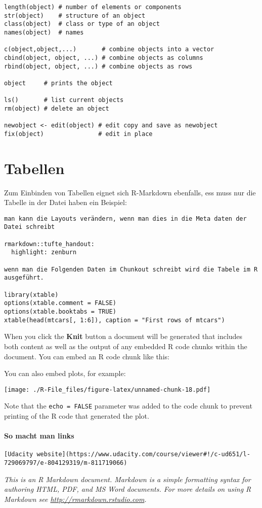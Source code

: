 \documentclass[]{article}
\begin{document}
\begin{verbatim}
length(object) # number of elements or components
str(object)    # structure of an object 
class(object)  # class or type of an object
names(object)  # names

c(object,object,...)       # combine objects into a vector
cbind(object, object, ...) # combine objects as columns
rbind(object, object, ...) # combine objects as rows 

object     # prints the object

ls()       # list current objects
rm(object) # delete an object

newobject <- edit(object) # edit copy and save as newobject 
fix(object)               # edit in place
\end{verbatim}

\section{Tabellen}\label{tabellen}

Zum Einbinden von Tabellen eignet sich R-Markdown ebenfalls, ess muss
nur die Tabelle in der Datei haben ein Beispiel:

\begin{verbatim}
man kann die Layouts verändern, wenn man dies in die Meta daten der Datei schreibt

rmarkdown::tufte_handout:
  highlight: zenburn
  
wenn man die Folgenden Daten im Chunkout schreibt wird die Tabele im R ausgeführt.

library(xtable)
options(xtable.comment = FALSE)
options(xtable.booktabs = TRUE)
xtable(head(mtcars[, 1:6]), caption = "First rows of mtcars")
\end{verbatim}

When you click the \textbf{Knit} button a document will be generated
that includes both content as well as the output of any embedded R code
chunks within the document. You can embed an R code chunk like this:

You can also embed plots, for example:

\texttt{[image: ./R-File\_files/figure-latex/unnamed-chunk-18.pdf]}

Note that the \texttt{echo = FALSE} parameter was added to the code
chunk to prevent printing of the R code that generated the plot.

\paragraph{So macht man links}\label{so-macht-man-links}

\begin{verbatim}
[Udacity website](https://www.udacity.com/course/viewer#!/c-ud651/l-729069797/e-804129319/m-811719066)
\end{verbatim}

\emph{This is an R Markdown document. Markdown is a simple formatting
syntax for authoring HTML, PDF, and MS Word documents. For more details
on using R Markdown see \url{http://rmarkdown.rstudio.com}.}
\end{document}
